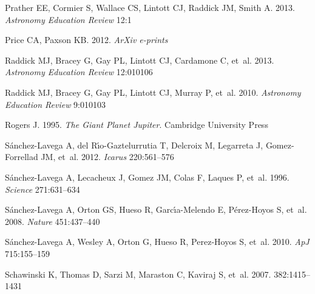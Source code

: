 \documentclass{ar2e}
\begin{document}
\begin{thebibliography}{}
{Prather} EE, {Cormier} S, {Wallace} CS, {Lintott} CJ, {Raddick} JM, {Smith} A.
  2013.
\newblock \textit{{Astronomy Education Review}} 12:1

{Price} CA, {Paxson} KB. 2012.
\newblock \textit{ArXiv e-prints}

{Raddick} MJ, {Bracey} G, {Gay} PL, {Lintott} CJ, {Cardamone} C, et~al. 2013.
\newblock \textit{Astronomy Education Review} 12:010106

{Raddick} MJ, {Bracey} G, {Gay} PL, {Lintott} CJ, {Murray} P, et~al. 2010.
\newblock \textit{Astronomy Education Review} 9:010103

Rogers J. 1995.
\newblock \textit{{The Giant Planet Jupiter}}.
\newblock Cambridge University Press

{S{\'a}nchez-Lavega} A, {del R{\'{\i}}o-Gaztelurrutia} T, {Delcroix} M,
  {Legarreta} J, {Gomez-Forrellad} JM, et~al. 2012.
\newblock \textit{Icarus} 220:561--576

{S{\'a}nchez-Lavega} A, {Lecacheux} J, {Gomez} JM, {Colas} F, {Laques} P,
  et~al. 1996.
\newblock \textit{Science} 271:631--634

{S{\'a}nchez-Lavega} A, {Orton} GS, {Hueso} R, {Garc{\'{\i}}a-Melendo} E,
  {P{\'e}rez-Hoyos} S, et~al. 2008.
\newblock \textit{Nature} 451:437--440

S{\'a}nchez-Lavega A, Wesley A, Orton G, Hueso R, Perez-Hoyos S, et~al. 2010.
\newblock \textit{ApJ} 715:155--159

{Schawinski} K, {Thomas} D, {Sarzi} M, {Maraston} C, {Kaviraj} S, et~al. 2007.
\newblock \textit{\mnras} 382:1415--1431


\end{thebibliography}
\end{document}
